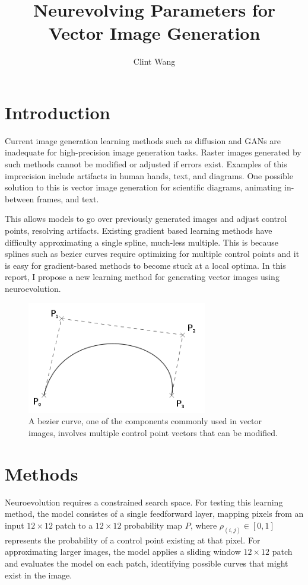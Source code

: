 \documentclass{article}
\title{Neurevolving Parameters for Vector Image Generation}
\author{Clint Wang}
\date{}
\begin{document}
\maketitle

\section{Introduction}

Current image generation learning methods such as diffusion and GANs are inadequate for high-precision image generation tasks. Raster images generated by such methods cannot be modified or adjusted if errors exist. Examples of this imprecision include artifacts in human hands, text, and diagrams. One possible solution to this is vector image generation for scientific diagrams, animating in-between frames, and text. 

This allows models to go over previously generated images and adjust control points, resolving artifacts. Existing gradient based learning methods have difficulty approximating a single spline, much-less multiple. This is because splines such as bezier curves require optimizing for multiple control points and it is easy for gradient-based methods to become stuck at a local optima. In this report, I propose a new learning method for generating vector images using neuroevolution. 

\begin{figure}[!ht]
\centering
\includegraphics[width=0.7\textwidth]{bezier.png}
\caption{A bezier curve, one of the components commonly used in vector images, involves multiple control point vectors that can be modified. }
\end{figure}

\section{Methods}

Neuroevolution requires a constrained search space. For testing this learning method, the model consistes of a single feedforward layer, mapping pixels from an input $12\times12$ patch to a $12\times12$ probability map $P$, where $\rho_{(i, j)} \in [0, 1]$ represents the probability of a control point existing at that pixel. For approximating larger images, the model applies a sliding window $12\times12$ patch and evaluates the model on each patch, identifying possible curves that might exist in the image. 
\end{document}
